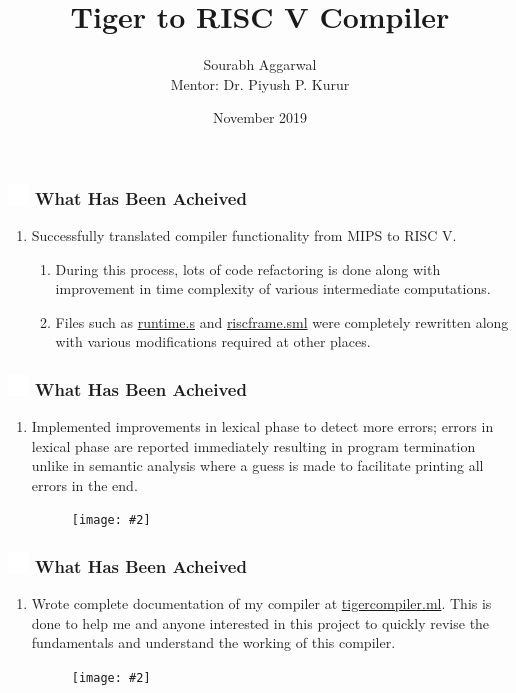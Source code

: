 \documentclass{beamer}
\title{Tiger to RISC V Compiler}
\author{Sourabh Aggarwal\\ Mentor: Dr. Piyush P. Kurur}
\institute[IIT Palakkad] %
{
  Department of Computer Science And Engineering\\
  IIT Palakkad
}
\date{November 2019}
\newcommand{\iph}[2]{
    \texttt{[image: \#2]}
}
\newcommand{\ft}[1]{
  \frametitle{\includegraphics[height=0.55cm, width=0.55cm, keepaspectratio]{assets/tiger.png} #1}
}
\newcounter{saveenumi}
\newcommand{\seti}{\setcounter{saveenumi}{\value{enumi}}}
\newcommand{\conti}{\setcounter{enumi}{\value{saveenumi}}}
\begin{document}
\begin{frame}
  \titlepage
\end{frame}

\begin{frame}[fragile]
  \ft{What Has Been Acheived}
  \begin{enumerate}
    \item Successfully translated compiler functionality from MIPS to RISC V.
    \begin{enumerate} 
      \item During this process, lots of code refactoring is done along with improvement in time complexity of various intermediate computations. 
      \item Files such as \href{https://github.com/sourabh2311/btp/blob/master/Compiler/runtime.s}{runtime.s} and \href{https://github.com/sourabh2311/btp/blob/master/Compiler/riscframe.sml}{riscframe.sml} were completely rewritten along with various modifications required at other places.
    \end{enumerate}
      \seti
  \end{enumerate}
\end{frame}

\begin{frame}[fragile]
  \ft{What Has Been Acheived}
  \begin{enumerate}
    \conti
    \item Implemented improvements in lexical phase to detect more errors; errors in lexical phase are reported immediately resulting in program termination unlike in semantic analysis where a guess is made to facilitate printing all errors in the end.
    \begin{figure}
    \centering
    \iph{0.80}{assets/lexError.png}
    \label{fig:lexError}
    \end{figure}
    \seti
  \end{enumerate}
\end{frame}

\begin{frame}[fragile]
  \ft{What Has Been Acheived}
  \begin{enumerate}
    \conti
    \item Wrote complete documentation of my compiler at \href{https://tigercompiler.ml}{tigercompiler.ml}. This is done to help me and anyone interested in this project to quickly revise the fundamentals and understand the working of this compiler.
    \begin{figure}
    \centering
    \iph{0.80}{assets/tigercompiler.png}
    \label{fig:tigercompiler}
    \end{figure}
    \seti
  \end{enumerate}
\end{frame}
\end{document}
